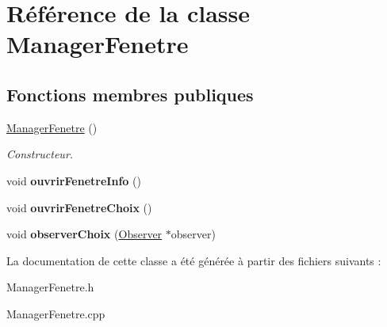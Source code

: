 \hypertarget{classManagerFenetre}{\section{\-Référence de la classe \-Manager\-Fenetre}
\label{classManagerFenetre}
}
\subsection*{\-Fonctions membres publiques}
\begin{DoxyCompactItemize}
\item 
\hypertarget{classManagerFenetre_adde6ceef42d5ed5000cb9dbc76ef1442}{\hyperlink{classManagerFenetre_adde6ceef42d5ed5000cb9dbc76ef1442}{\-Manager\-Fenetre} ()}\label{classManagerFenetre_adde6ceef42d5ed5000cb9dbc76ef1442}

\begin{DoxyCompactList}\small\item\em \-Constructeur. \end{DoxyCompactList}\item 
\hypertarget{classManagerFenetre_a946bf5d3b2fba1cdca3713a0d850c0c2}{void {\bfseries ouvrir\-Fenetre\-Info} ()}\label{classManagerFenetre_a946bf5d3b2fba1cdca3713a0d850c0c2}

\item 
\hypertarget{classManagerFenetre_a28623b59c8cca914ba1c91a8b17999ff}{void {\bfseries ouvrir\-Fenetre\-Choix} ()}\label{classManagerFenetre_a28623b59c8cca914ba1c91a8b17999ff}

\item 
\hypertarget{classManagerFenetre_a400a128ee4377b13c4e680e6eba18921}{void {\bfseries observer\-Choix} (\hyperlink{classObserver}{\-Observer} $\ast$observer)}\label{classManagerFenetre_a400a128ee4377b13c4e680e6eba18921}

\end{DoxyCompactItemize}


\-La documentation de cette classe a été générée à partir des fichiers suivants \-:\begin{DoxyCompactItemize}
\item 
\-Manager\-Fenetre.\-h\item 
\-Manager\-Fenetre.\-cpp\end{DoxyCompactItemize}
